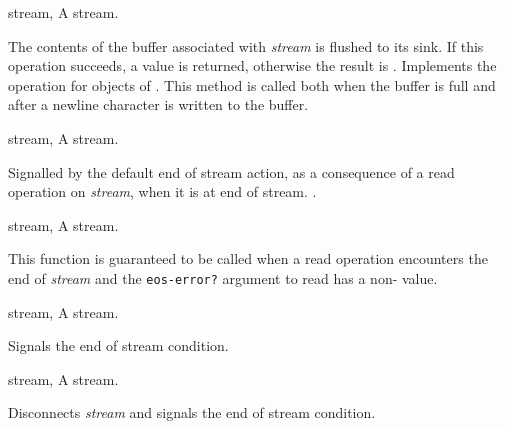 \begin{optDefinition}
\begin{specargs}
    \item[stream, \classref{file-stream}] A stream.
\end{specargs}
%
\result%
The contents of the buffer associated with {\em stream} is flushed to
its sink. If this operation succeeds, a \true{} value is returned, otherwise the
result is \nil{}.
%
\remarks%
Implements the  operation for objects of
. This method is called both when the buffer is full and
after a newline character is written to the buffer.

\begin{initoptions}
    \item[stream, \classref{stream}] A stream.
\end{initoptions}
%
\remarks%
Signalled by the default end of stream action, as a consequence of a
read operation on {\em stream\/}, when it is at end of stream.
%
\seealso%
.

\begin{genericargs}
    \item[stream, \classref{buffered-stream}] A stream.
\end{genericargs}
%
\remarks%
This function is guaranteed to be called when a read operation
encounters the end of {\em stream\/} and the {\tt eos-error?} argument to read
has a non-\nil{}\/ value.

\begin{specargs}
    \item[stream, \classref{buffered-stream}] A stream.
\end{specargs}
%
\remarks%
Signals the end of stream condition.

\begin{specargs}
    \item[stream, \classref{file-stream}] A stream.
\end{specargs}
%
\remarks%
Disconnects {\em stream\/} and signals the end of stream condition.


\end{optDefinition}

